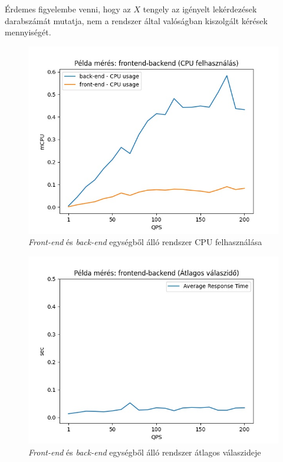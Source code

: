 Érdemes figyelembe venni, hogy az $X$ tengely az igényelt lekérdezések darabszámát mutatja, nem a rendszer által valóságban kiszolgált kérések mennyiségét. \\


\begin{figure}[!ht]
\centering
\includegraphics[width=150mm, keepaspectratio]{figures/sample_plot_cpu.jpg}
\caption{\textit{Front-end} és \textit{back-end} egységből álló rendszer CPU felhasználása}
\label{fig:example_plot}
\end{figure}

\begin{figure}[!ht]
\centering
\includegraphics[width=150mm, keepaspectratio]{figures/sample_plot_responsetime.jpg}
\caption{\textit{Front-end} és \textit{back-end} egységből álló rendszer átlagos válaszideje}
\label{fig:example_responsetime}
\end{figure}


